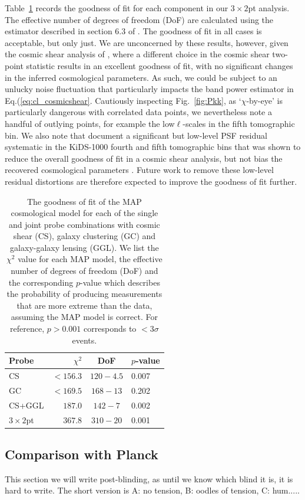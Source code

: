 Table~\ref{tab:goodness-of-fit} records the goodness of fit for each component in our $3\times2$pt analysis.  The effective number of degrees of freedom (DoF) are calculated using the estimator described in section 6.3 of \citet{joachimi/etal:inprep}.   The goodness of fit in all cases is acceptable, but only just.    We are unconcerned by these results, however, given the cosmic shear analysis of \citet{asgari/etal:inprep}, where a different choice in the cosmic shear two-point statistic results in an excellent goodness of fit, with no significant changes in the inferred cosmological parameters.    As such, we could be subject to an unlucky noise fluctuation that particularly impacts the band power estimator in Eq.(\ref{eq:cl_cosmicshear}.  Cautiously inspecting Fig.~\ref{fig:Pkk}, as `$\chi$-by-eye' is particularly dangerous with correlated data points, we nevertheless note a handful of outlying points, for example the low$\ell$-scales in the fifth tomographic bin.   We also note that \citet{giblin/etal:inprep} document a significant but low-level PSF residual systematic in the KiDS-1000 fourth and fifth tomographic bins that was shown to reduce the overall goodness of fit in a cosmic shear analysis, but not bias the recovered cosmological parameters \citep[see also the discussion in][]{amara/refregier:2008}.  Future work to remove these low-level residual distortions are therefore expected to improve the goodness of fit further.

\begin{table}
	\begin{center}
		\caption{The goodness of fit of the MAP cosmological model for each of the single and joint probe combinations with cosmic shear (CS), galaxy clustering (GC) and galaxy-galaxy lensing (GGL).   We list the $\chi^2$ value for each MAP model, the effective number of degrees of freedom (DoF) and the corresponding $p$-value which describes the probability of producing measurements that are more extreme than the data, assuming the MAP model is correct.   For reference, $p > 0.001$ corresponds to $<3\sigma$ events.}
		\label{tab:goodness-of-fit}
\begin{tabular}{lrcl}
    \toprule
    Probe             & $\chi^2$       & DoF       & $p$-value   \\
    \midrule
	CS               & $< 156.3$ & $120-4.5$ & 0.007 \\
	GC               & $< 169.5$ & $168-13$ & 0.202 \\
	CS+GGL           & $187.0$ & $142-7$ & 0.002 \\
	$3\times2$pt            & $367.8$ & $310-20$ & 0.001 \\

    \bottomrule
\end{tabular}
	\end{center}
\end{table}


\subsection{Comparison with Planck}
\label{sec:planck_comp}
This section we will write post-blinding, as until we know which blind it is, it is hard to write.   The short version is A: no tension,  B: oodles of tension,  C: hum.....



